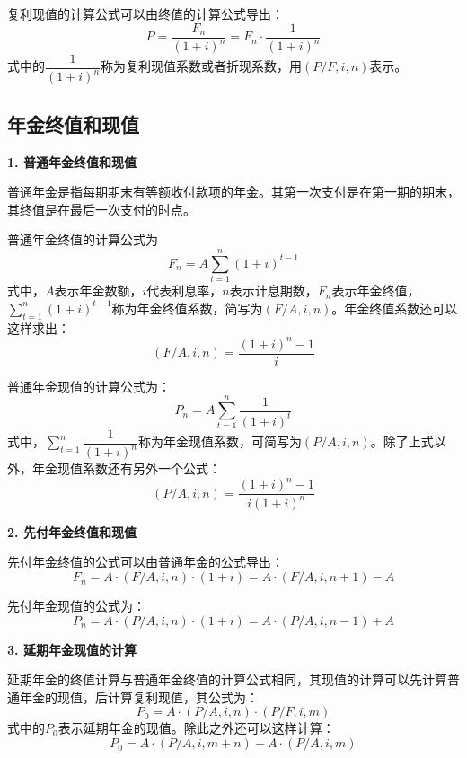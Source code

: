 \documentclass[
  10pt,
  twoside,
  openany,
  b5paper, %
  colorscheme = black, %
  xits = false,
]{qyxf-book}
\begin{document}
复利现值的计算公式可以由终值的计算公式导出：
\begin{equation*}
	P = \frac{F_n}{(1+i)^n} = F_n \cdot \frac{1}{(1+i)^n} 
\end{equation*}
式中的$\dfrac{1}{(1+i)^n}$称为复利现值系数或者折现系数，用$(P/F,i,n)$表示。

\subsection{年金终值和现值}
\textbf{1. 普通年金终值和现值}

普通年金是指每期期末有等额收付款项的年金。其第一次支付是在第一期的期末，其终值是在最后一次支付的时点。

普通年金终值的计算公式为
\begin{equation*}
	F_n = A \sum_{t=1}^{n} (1+i)^{t-1} 
\end{equation*}
式中，$A$表示年金数额，$i$代表利息率，$n$表示计息期数，$F_n$表示年金终值，$\sum\limits_{t=1}^{n}(1+i)^{t-1}$称为年金终值系数，简写为$(F/A,i,n)$。年金终值系数还可以这样求出：
\begin{equation*}
	(F/A,i,n) = \frac{(1+i)^n -1}{i}
\end{equation*}

普通年金现值的计算公式为：
\begin{equation*}
	P_n = A\sum_{t=1}^{n} \frac{1}{(1+i)^t} 
\end{equation*}
式中，$\sum\limits_{t=1}^{n} \dfrac{1}{(1+i)^n}$称为年金现值系数，可简写为$(P/A,i,n)$。除了上式以外，年金现值系数还有另外一个公式：
\begin{equation*}
	(P/A,i,n) = \frac{(1+i)^n-1}{i(1+i)^n}
\end{equation*}

\textbf{2. 先付年金终值和现值}

先付年金终值的公式可以由普通年金的公式导出：
\begin{equation*}
	F_n = A \cdot (F/A,i,n) \cdot (1+i) =A \cdot (F/A,i,n+1)-A
\end{equation*}

先付年金现值的公式为：
\begin{equation*}
	P_n = A \cdot (P/A,i,n) \cdot (1+i)=A\cdot (P/A,i,n-1) + A
\end{equation*}

\textbf{3. 延期年金现值的计算}

延期年金的终值计算与普通年金终值的计算公式相同，其现值的计算可以先计算普通年金的现值，后计算复利现值，其公式为：
\begin{equation*}
	P_0 = A \cdot (P/A,i,n) \cdot (P/F,i,m)
\end{equation*}
式中的$P_0$表示延期年金的现值。除此之外还可以这样计算：
\begin{equation*}
	P_0 = A\cdot (P/A,i,m+n) - A\cdot (P/A,i,m)
\end{equation*}
\end{document}
